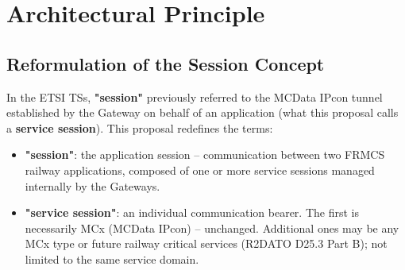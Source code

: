 \documentclass[11pt,a4paper]{article}
\begin{document}
\begin{titlepage}
\end{titlepage}

\tableofcontents\clearpage

\section{Architectural Principle}

\subsection{Reformulation of the Session Concept}
\label{concept}

In the ETSI TSs, \textbf{"session"} previously referred to the MCData IPcon tunnel
established by the Gateway on behalf of an application (what this proposal calls a
\textbf{service session}). This proposal redefines the terms:

\begin{itemize}[leftmargin=2em]
  \item \textbf{"session"}: the application session -- communication between two FRMCS
    railway applications, composed of one or more service sessions managed internally
    by the Gateways.
  \item \textbf{"service session"}: an individual communication bearer. The first is
    necessarily MCx (MCData IPcon) -- unchanged. Additional ones may be any MCx type
    or future railway critical services (R2DATO D25.3 Part B); not limited to the same
    service domain.
\end{itemize}
\end{document}
